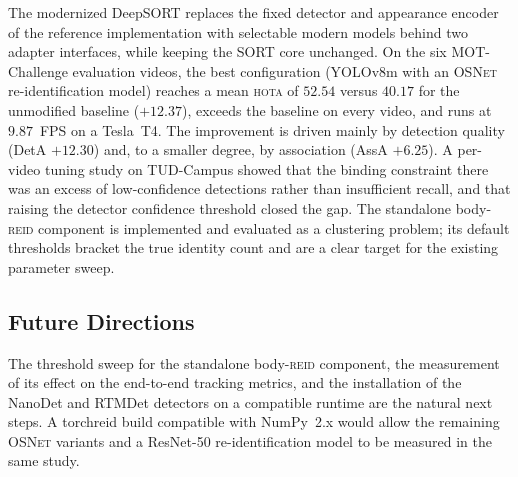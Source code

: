 \documentclass[12pt, a4paper]{article}
\newcommand{\hota}{\textsc{hota}}
\newcommand{\osnet}{\textsc{OSNet}}
\newcommand{\reid}{\textsc{reid}}
\begin{document}
The modernized DeepSORT replaces the fixed detector and appearance encoder of the reference
implementation with selectable modern models behind two adapter interfaces, while keeping the SORT
core unchanged. On the six MOT-Challenge evaluation videos, the best configuration (YOLOv8m with an
\osnet{} re-identification model) reaches a mean \hota{} of $52.54$ versus $40.17$ for the unmodified
baseline ($+12.37$), exceeds the baseline on every video, and runs at $9.87$~FPS on a Tesla~T4. The
improvement is driven mainly by detection quality (DetA $+12.30$) and, to a smaller degree, by
association (AssA $+6.25$). A per-video tuning study on TUD-Campus showed that the binding constraint
there was an excess of low-confidence detections rather than insufficient recall, and that raising the
detector confidence threshold closed the gap. The standalone body-\reid{} component is implemented and
evaluated as a clustering problem; its default thresholds bracket the true identity count and are a
clear target for the existing parameter sweep.

\subsection{Future Directions}
The threshold sweep for the standalone body-\reid{} component, the measurement of its effect on the
end-to-end tracking metrics, and the installation of the NanoDet and RTMDet detectors on a compatible
runtime are the natural next steps. A torchreid build compatible with NumPy~2.x would allow the
remaining \osnet{} variants and a ResNet-50 re-identification model to be measured in the same study.
\end{document}

